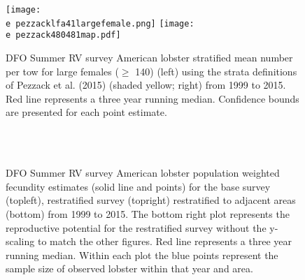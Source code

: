 \documentclass[11pt]{article}
\newcommand{\D}{.}
\newcommand{\e}{/backup/bio_data/bio.lobster/figures/} %
\begin{document}
\begin{landscape}
\begin{figure}
\centering
    \texttt{[image: \\e pezzacklfa41largefemale.png]} 
    \texttt{[image: \\e pezzack480481map.pdf]} 
    
    \caption{DFO Summer RV survey American lobster stratified mean number per tow for large females ($\geq$ 140) (left) using the strata definitions of Pezzack et al. (2015) (shaded yellow; right) from 1999 to 2015. Red line represents a three year running median. Confidence bounds are presented for each point estimate.}

\end{figure}
\end{landscape}



\begin{figure}
\centering
{}
\\
\\

\caption{DFO Summer RV survey American lobster population weighted fecundity estimates (solid line and points) for the base survey (topleft), restratified survey (topright) restratified to adjacent areas (bottom) from 1999 to 2015. The bottom right plot represents the reproductive potential for the restratified survey without the y-scaling to match the other figures. Red line represents a three year running median. Within each plot the blue points represent the sample size of observed lobster within that year and area.}
\end{figure}
\clearpage
\end{document}
